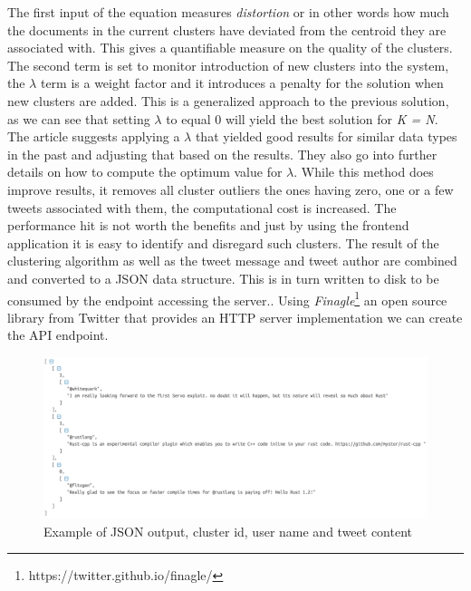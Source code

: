 The first input of the equation measures \textit{distortion} or in other words how much the documents in the current clusters have deviated from the centroid they are associated with. This gives a quantifiable measure on the quality of the clusters. The second term is set to monitor introduction of new clusters into the system, the $\lambda$ term is a weight factor and it introduces a penalty for the solution when new clusters are added. This is a generalized approach to the previous solution, as we can see that setting $\lambda$ to equal 0 will yield the best solution for \textit{K = N}. The article suggests applying a $\lambda$ that yielded good results for similar data types in the past and adjusting that based on the results. They also go into further details on how to compute the optimum value for $\lambda$.
\newline
While this method does improve results, it removes all cluster outliers the ones having zero, one or a few tweets associated with them, the computational cost is increased. The performance hit is not worth the benefits and just by using the frontend application it is easy to identify and disregard such clusters.
\newline
The result of the clustering algorithm as well as the tweet message and tweet author are combined and converted to a JSON data structure. This is in turn written to disk to be consumed by the endpoint accessing the server.. Using \textit{Finagle}\footnote{https://twitter.github.io/finagle/} an open source library from Twitter that provides an HTTP server implementation we can create the API endpoint.
\newline
\begin{figure}[ht!]
\centering
\includegraphics[width=\textwidth,height=\textheight,keepaspectratio]{src/img/jsonoutput.png}
\caption{Example of JSON output, cluster id, user name and tweet content\label{overflow}}
\end{figure}
\newline

